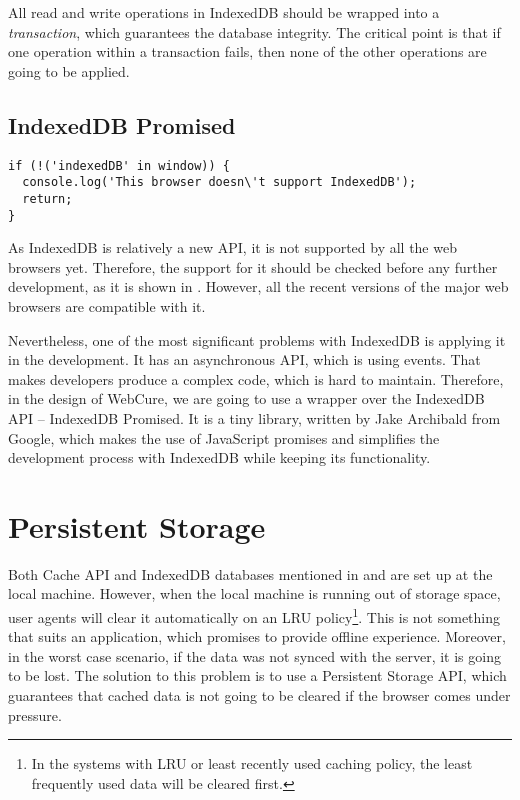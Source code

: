 All read and write operations in IndexedDB should be wrapped into a \textit{transaction}, which guarantees the database integrity. The critical point is that if one operation within a transaction fails, then none of the other operations are going to be applied. 

\subsection{IndexedDB Promised}

\begin{lstlisting}[caption={[Code for checking the support of IndexedDB API]Code, which demonstrates how one can check the support for IndexedDB API\cite{35}.}, label={lst:tech7}]
if (!('indexedDB' in window)) {
  console.log('This browser doesn\'t support IndexedDB');
  return;
}
\end{lstlisting}

As IndexedDB is relatively a new API, it is not supported by all the web browsers yet. Therefore, the support for it should be checked before any further development, as it is shown in . However, all the recent versions of the major web browsers are compatible with it. 

Nevertheless, one of the most significant problems with IndexedDB is applying it in the development. It has an asynchronous API, which is using events. That makes developers produce a complex code, which is hard to maintain. Therefore, in the design of WebCure, we are going to use a wrapper over the IndexedDB API -- IndexedDB Promised\cite{36, 48}. It is a tiny library, written by Jake Archibald from Google, which makes the use of JavaScript promises and simplifies the development process with IndexedDB while keeping its functionality.

\section{Persistent Storage}
\label{persistentstorage}

Both Cache API and IndexedDB databases mentioned in  and  are set up at the local machine. However, when the local machine is running out of storage space, user agents will clear it automatically on an LRU policy\footnote{In the systems with LRU or least recently used caching policy, the least frequently used data will be cleared first.}\cite{47}. This is not something that suits an application, which promises to provide offline experience. Moreover, in the worst case scenario, if the data was not synced with the server, it is going to be lost. The solution to this problem is to use a Persistent Storage API\cite{45, 46}, which guarantees that cached data is not going to be cleared if the browser comes under pressure.

